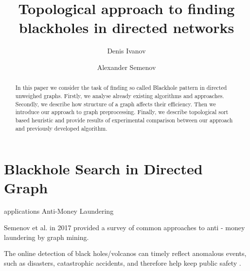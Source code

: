 \documentclass{svproc}
\begin{document}
\mainmatter              %
%
\title{Topological approach to finding blackholes in directed networks}
%
%
\author{Denis Ivanov \and Alexander Semenov}
%
%
%

\maketitle              %

\begin{abstract}
In this paper we consider the task of finding so called Blackhole pattern in directed unweighed graphs.
Firstly, we analyse already existing algorithms and approaches. Secondly, we describe how structure of a graph
affects their efficiency. Then we introduce our approach to graph preprocessing. Finally, we describe topological sort based heuristic
and provide results of experimental comparison between our approach and previously developed algorithm.
\end{abstract}

\section{Blackhole Search in Directed Graph}
applications Anti-Money Laundering \cite{semenov2017survey}

Semenov et al. \cite{semenov2017survey}
in 2017 provided a survey of common approaches to anti - money laundering by graph mining.

The online detection of black holes/volcanos can timely
reflect anomalous events, such as disasters, catastrophic accidents,
and therefore help keep public safety \cite{hong2015detecting}.
\end{document}
